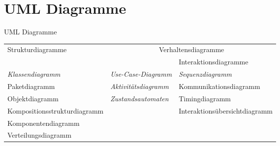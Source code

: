 \section{UML Diagramme}

\begin{bonus}{UML Diagramme}
    \begin{tabular}{|l|l|l|}
        \hline
        \multirow{2}{*}{Strukturdiagramme} & \multicolumn{2}{c|}{Verhaltensdiagramme}                                 \\\cline{2-3}
                                           &                                          & Interaktionsdiagramme         \\\hline
        \emph{Klassendiagramm}             & \emph{Use-Case-Diagramm }                & \emph{Sequenzdiagramm}        \\
        Paketdiagramm                      & \emph{Aktivitätsdiagramm}                & Kommunikationsdiagramm        \\
        Objektdiagramm                     & \emph{Zustandsautomaten}                 & Timingdiagramm                \\
        Kompositionsstrukturdiagramm       &                                          & Interaktionsübersichtdiagramm \\
        Komponentendiagramm                &                                          &                               \\
        Verteilungsdiagramm                &                                          &                               \\\hline
    \end{tabular}
\end{bonus}

